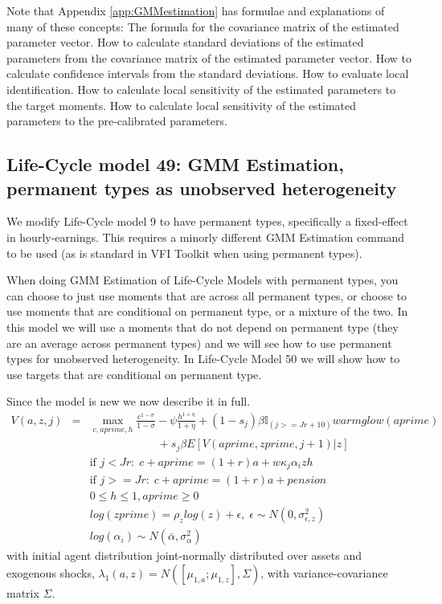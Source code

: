 Note that Appendix \ref{app:GMMestimation} has formulae and explanations of many of these concepts: The formula for the covariance matrix of the estimated parameter vector. How to calculate standard deviations of the estimated parameters from the covariance matrix of the estimated parameter vector. How to calculate confidence intervals from the standard deviations. How to evaluate local identification. How to calculate local sensitivity of the estimated parameters to the target moments. How to calculate local sensitivity of the estimated parameters to the pre-calibrated parameters.


\subsection{Life-Cycle model 49: GMM Estimation, permanent types as unobserved heterogeneity}
We modify Life-Cycle model 9 to have permanent types, specifically a fixed-effect in hourly-earnings. This requires a minorly different GMM Estimation command to be used (as is standard in VFI Toolkit when using permanent types).

When doing GMM Estimation of Life-Cycle Models with permanent types, you can choose to just use moments that are across all permanent types, or choose to use moments that are conditional on permanent type, or a mixture of the two. In this model we will use a moments that do not depend on permanent type (they are an average across permanent types) and we will see how to use permanent types for unobserved heterogeneity. In Life-Cycle Model 50 we will show how to use targets that are conditional on permanent type.

Since the model is new we now describe it in full.
\begin{eqnarray*}
 V(a,z,j)&=& \max_{c,aprime,h} \frac{c^{1-\sigma}}{1-\sigma} - \psi \frac{h^{1+\eta}}{1+\eta} + (1-s_j)\beta  \mathbb{I}_{(j>=Jr+10)} warmglow(aprime)    \\
 && \quad \quad \quad \quad \quad \quad  + s_j \beta E[V(aprime,zprime,j+1)|z] \\
&& \text{if }j<Jr: \; c+aprime=(1+r)a+w \kappa_j \alpha_i z h\\
&& \text{if }j>=Jr: \; c+aprime=(1+r)a +pension\\
&& 0\leq h \leq 1, aprime\geq 0 \\
&& log(zprime)=\rho_z log(z) + \epsilon, \; \epsilon \sim N(0,\sigma_{\epsilon,z}^2) \\
&& log(\alpha_i) \sim N(\bar{\alpha}, \sigma_{\alpha}^2)
\end{eqnarray*}
with initial agent distribution joint-normally distributed over assets and exogenous shocks, $\lambda_1(a,z)=N([\mu_{1,a};\mu_{1,z}],\Sigma)$, with variance-covariance matrix $\Sigma$.

